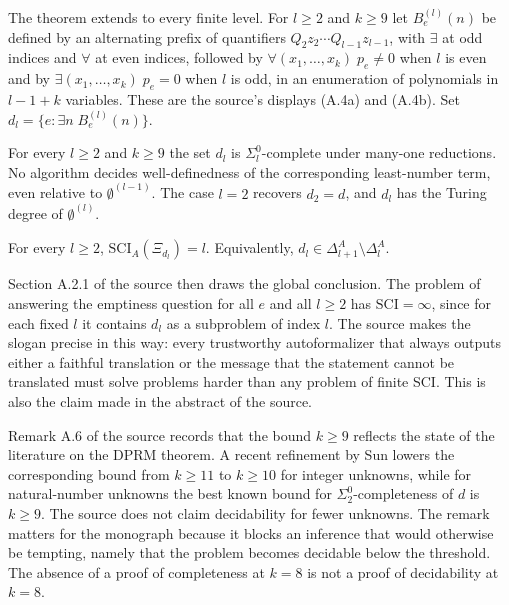 The theorem extends to every finite level. For $l \ge 2$ and $k \ge 9$ let $B^{(l)}_e(n)$ be defined by an alternating prefix of quantifiers $Q_2 z_2 \cdots Q_{l-1} z_{l-1}$, with $\exists$ at odd indices and $\forall$ at even indices, followed by $\forall (x_1, \dots, x_k)\; p_e \ne 0$ when $l$ is even and by $\exists (x_1, \dots, x_k)\; p_e = 0$ when $l$ is odd, in an enumeration of polynomials in $l - 1 + k$ variables. These are the source's displays (A.4a) and (A.4b). Set $d_l = \{ e : \exists n\; B^{(l)}_e(n) \}$.

\begin{theorem}
\label{thm:A4}
For every $l \ge 2$ and $k \ge 9$ the set $d_l$ is $\Sigma^0_l$-complete under many-one reductions. No algorithm decides well-definedness of the corresponding least-number term, even relative to $\emptyset^{(l-1)}$. The case $l = 2$ recovers $d_2 = d$, and $d_l$ has the Turing degree of $\emptyset^{(l)}$.
\end{theorem}

\begin{corollary}
\label{cor:A5}
For every $l \ge 2$, $\mathrm{SCI}_A(\Xi_{d_l}) = l$. Equivalently, $d_l \in \Delta^A_{l+1} \setminus \Delta^A_l$.
\end{corollary}

Section A.2.1 of the source then draws the global conclusion. The problem of answering the emptiness question for all $e$ and all $l \ge 2$ has $\mathrm{SCI} = \infty$, since for each fixed $l$ it contains $d_l$ as a subproblem of index $l$. The source makes the slogan precise in this way: every trustworthy autoformalizer that always outputs either a faithful translation or the message that the statement cannot be translated must solve problems harder than any problem of finite SCI. This is also the claim made in the abstract of the source.

Remark A.6 of the source records that the bound $k \ge 9$ reflects the state of the literature on the DPRM theorem. A recent refinement by Sun lowers the corresponding bound from $k \ge 11$ to $k \ge 10$ for integer unknowns, while for natural-number unknowns the best known bound for $\Sigma^0_2$-completeness of $d$ is $k \ge 9$. The source does not claim decidability for fewer unknowns. The remark matters for the monograph because it blocks an inference that would otherwise be tempting, namely that the problem becomes decidable below the threshold. The absence of a proof of completeness at $k = 8$ is not a proof of decidability at $k = 8$.

